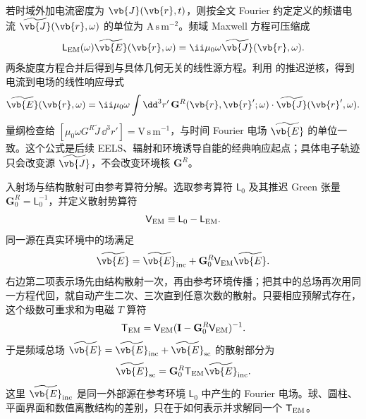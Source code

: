 \begin{proposition}[电流到电场的推迟响应]
若时域外加电流密度为 $\vb{J}(\vb{r},t)$，则按全文 Fourier 约定定义的频谱电流 $\widetilde{\vb{J}}(\vb{r},\omega)$ 的单位为 $\mathrm{A\,s\,m^{-2}}$。频域 Maxwell 方程可压缩成
\begin{equation}
{
\mathsf L_{\rm EM}(\omega)\widetilde{\vb{E}}(\vb{r},\omega)
=\ii\mu_0\omega\widetilde{\vb{J}}(\vb{r},\omega).}
\label{eq:maxwell-source-operator-dp68}
\end{equation}
两条旋度方程合并后得到与具体几何无关的线性源方程。利用 的推迟逆核，得到电流到电场的线性响应母式
\begin{equation}
 {
 \widetilde{\vb{E}}(\vb{r},\omega)
 =\ii\mu_0\omega
 \int\dd^3 r'\,
 \mathbf G^R(\vb{r},\vb{r}';\omega)
 \cdot\widetilde{\vb{J}}(\vb{r}',\omega).}
 \label{eq:E-from-GJ-SI-r12}\end{equation}
量纲检查给 $[\mu_0\omega G^R\widetilde J\,\dd^3 r']=\mathrm{V\,s\,m^{-1}}$，与时间 Fourier 电场 $\widetilde{\vb{E}}$ 的单位一致。这个公式是后续 EELS、辐射和环境诱导自能的经典响应起点；具体电子轨迹只会改变源 $\widetilde{\vb{J}}$，不会改变环境核 $\mathbf G^R$。

\end{proposition}

入射场与结构散射可由参考算符分解。选取参考算符 $\mathsf L_0$ 及其推迟 Green 张量 $\mathbf G_0^R=\mathsf L_0^{-1}$，并定义散射势算符
\begin{equation*}
 \mathsf V_{\rm EM}\equiv\mathsf L_0-\mathsf L_{\rm EM}.
\end{equation*}
同一源在真实环境中的场满足
\begin{equation}
{
\widetilde{\vb{E}}
=\widetilde{\vb{E}}_{\rm inc}+\mathbf G_0^R\mathsf V_{\rm EM}\widetilde{\vb{E}}.}
\label{eq:maxwell-lippmann-schwinger-dp68}
\end{equation}
右边第二项表示场先由结构散射一次，再由参考环境传播；把其中的总场再次用同一方程代回，就自动产生二次、三次直到任意次数的散射。只要相应预解式存在，这个级数可重求和为电磁 $T$ 算符
\begin{equation}
 {
 \mathsf T_{\rm EM}
 =\mathsf V_{\rm EM}
 (\mathbf I-\mathbf G_0^R\mathsf V_{\rm EM})^{-1}.}
 \label{eq:maxwell-t-operator-def-r16}
\end{equation}
于是频域总场 $\widetilde{\vb{E}}=\widetilde{\vb{E}}_{\rm inc}+\widetilde{\vb{E}}_{\rm sc}$ 的散射部分为
\begin{equation}
 {
 \widetilde{\vb{E}}_{\rm sc}
 =\mathbf G_0^R\mathsf T_{\rm EM}\widetilde{\vb{E}}_{\rm inc}.}
 \label{eq:maxwell_scattered_field_t_operator}
\end{equation}
这里 $\widetilde{\vb{E}}_{\rm inc}$ 是同一外部源在参考环境 $\mathsf L_0$ 中产生的 Fourier 电场。球、圆柱、平面界面和数值离散结构的差别，只在于如何表示并求解同一个 $\mathsf T_{\rm EM}$。

